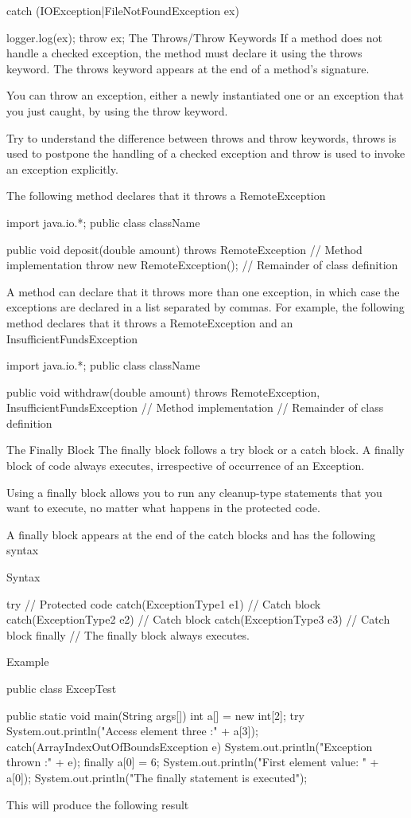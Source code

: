 catch (IOException|FileNotFoundException ex) {
   logger.log(ex);
   throw ex;
The Throws/Throw Keywords
If a method does not handle a checked exception, the method must declare it using the throws keyword. The throws keyword appears at the end of a method's signature.

You can throw an exception, either a newly instantiated one or an exception that you just caught, by using the throw keyword.

Try to understand the difference between throws and throw keywords, throws is used to postpone the handling of a checked exception and throw is used to invoke an exception explicitly.

The following method declares that it throws a RemoteException

import java.io.*;
public class className {

   public void deposit(double amount) throws RemoteException {
      // Method implementation
      throw new RemoteException();
   }
   // Remainder of class definition
}
A method can declare that it throws more than one exception, in which case the exceptions are declared in a list separated by commas. For example, the following method declares that it throws a RemoteException and an InsufficientFundsException

import java.io.*;
public class className {

   public void withdraw(double amount) throws RemoteException,
      InsufficientFundsException {
      // Method implementation
   }
   // Remainder of class definition
}
The Finally Block
The finally block follows a try block or a catch block. A finally block of code always executes, irrespective of occurrence of an Exception.

Using a finally block allows you to run any cleanup-type statements that you want to execute, no matter what happens in the protected code.

A finally block appears at the end of the catch blocks and has the following syntax

Syntax

try {
   // Protected code
}catch(ExceptionType1 e1) {
   // Catch block
}catch(ExceptionType2 e2) {
   // Catch block
}catch(ExceptionType3 e3) {
   // Catch block
}finally {
   // The finally block always executes.
}

Example

public class ExcepTest {

   public static void main(String args[]) {
      int a[] = new int[2];
      try {
         System.out.println("Access element three :" + a[3]);
      }catch(ArrayIndexOutOfBoundsException e) {
         System.out.println("Exception thrown  :" + e);
      }finally {
         a[0] = 6;
         System.out.println("First element value: " + a[0]);
         System.out.println("The finally statement is executed");
      }
   }
}
This will produce the following result

}
